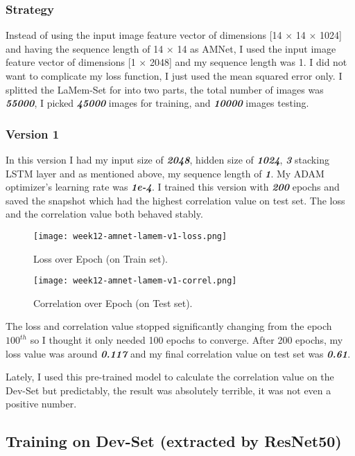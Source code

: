 \subsubsection{Strategy}
Instead of using the input image feature vector of dimensions [14 $\times$ 14 $\times$ 1024] and having the sequence length of 14 $\times$ 14 as AMNet, I used the input image feature vector of dimensions [1 $\times$ 2048] and my sequence length was 1. I did not want to complicate my loss function, I just used the mean squared error only. I splitted the LaMem-Set for into two parts, the total number of images was \textbf{\emph{55000}}, I picked \textbf{\emph{45000}} images for training, and \textbf{\emph{10000}} images testing.

\subsubsection{Version 1}
In this version I had my input size of \textbf{\emph{2048}}, hidden size of \textbf{\emph{1024}}, \textbf{\emph{3}} stacking LSTM layer and as mentioned above, my sequence length of \textbf{\emph{1}}. My ADAM optimizer's learning rate was \textbf{\emph{1e-4}}. I trained this version with \textbf{\emph{200}} epochs and saved the snapshot which had the highest correlation value on test set. The loss and the correlation value both behaved stably.

\begin{figure}[!ht]
\centering
\texttt{[image: week12-amnet-lamem-v1-loss.png]}
\caption{Loss over Epoch (on Train set).}
\end{figure}

\begin{figure}[!ht]
\centering
\texttt{[image: week12-amnet-lamem-v1-correl.png]}
\caption{Correlation over Epoch (on Test set).}
\end{figure}

The loss and correlation value stopped significantly changing from the epoch $100^{th}$ so I thought it only needed 100 epochs to converge. After 200 epochs, my loss value was around \textbf{\emph{0.117}} and my final correlation value on test set was \textbf{\emph{0.61}}.

Lately, I used this pre-trained model to calculate the correlation value on the Dev-Set but predictably, the result was absolutely terrible, it was not even a positive number.

\subsection{Training on Dev-Set (extracted by ResNet50)}
